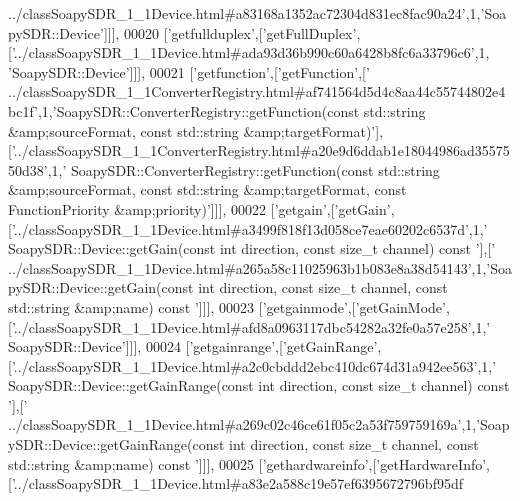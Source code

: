 \begin{DoxyCode}
{      ../classSoapySDR\_1\_1Device.html#a83168a1352ac72304d831ec8fac90a24'},1,\textcolor{stringliteral}{'SoapySDR::Device'}]]],
00020   [\textcolor{stringliteral}{'getfullduplex'},[\textcolor{stringliteral}{'getFullDuplex'},[\textcolor{stringliteral}{'../classSoapySDR\_1\_1Device.html#ada93d36b990c60a6428b8fc6a33796c6'},1,\textcolor{stringliteral}{
      'SoapySDR::Device'}]]],
00021   [\textcolor{stringliteral}{'getfunction'},[\textcolor{stringliteral}{'getFunction'},[\textcolor{stringliteral}{'
      ../classSoapySDR\_1\_1ConverterRegistry.html#af741564d5d4c8aa44c55744802e4bc1f'},1,\textcolor{stringliteral}{'SoapySDR::ConverterRegistry::getFunction(const std::string &amp;sourceFormat, const std::string
       &amp;targetFormat)'}],[\textcolor{stringliteral}{'../classSoapySDR\_1\_1ConverterRegistry.html#a20e9d6ddab1e18044986ad3557550d38'},1,\textcolor{stringliteral}{'
      SoapySDR::ConverterRegistry::getFunction(const std::string &amp;sourceFormat, const std::string &amp;targetFormat,
       const FunctionPriority &amp;priority)'}]]],
00022   [\textcolor{stringliteral}{'getgain'},[\textcolor{stringliteral}{'getGain'},[\textcolor{stringliteral}{'../classSoapySDR\_1\_1Device.html#a3499f818f13d058ce7eae60202c6537d'},1,\textcolor{stringliteral}{'
      SoapySDR::Device::getGain(const int direction, const size\_t channel) const '}],[\textcolor{stringliteral}{'
      ../classSoapySDR\_1\_1Device.html#a265a58c11025963b1b083e8a38d54143'},1,\textcolor{stringliteral}{'SoapySDR::Device::getGain(const int direction, const size\_t channel, const
       std::string &amp;name) const '}]]],
00023   [\textcolor{stringliteral}{'getgainmode'},[\textcolor{stringliteral}{'getGainMode'},[\textcolor{stringliteral}{'../classSoapySDR\_1\_1Device.html#afd8a0963117dbc54282a32fe0a57e258'},1,\textcolor{stringliteral}{'
      SoapySDR::Device'}]]],
00024   [\textcolor{stringliteral}{'getgainrange'},[\textcolor{stringliteral}{'getGainRange'},[\textcolor{stringliteral}{'../classSoapySDR\_1\_1Device.html#a2c0cbddd2ebc410dc674d31a942ee563'},1,\textcolor{stringliteral}{'
      SoapySDR::Device::getGainRange(const int direction, const size\_t channel) const '}],[\textcolor{stringliteral}{'
      ../classSoapySDR\_1\_1Device.html#a269c02c46ce61f05c2a53f759759169a'},1,\textcolor{stringliteral}{'SoapySDR::Device::getGainRange(const int direction, const
       size\_t channel, const std::string &amp;name) const '}]]],
00025   [\textcolor{stringliteral}{'gethardwareinfo'},[\textcolor{stringliteral}{'getHardwareInfo'},[\textcolor{stringliteral}{'../classSoapySDR\_1\_1Device.html#a83e2a588c19e57ef6395672796bf95df
}
\end{DoxyCode}
